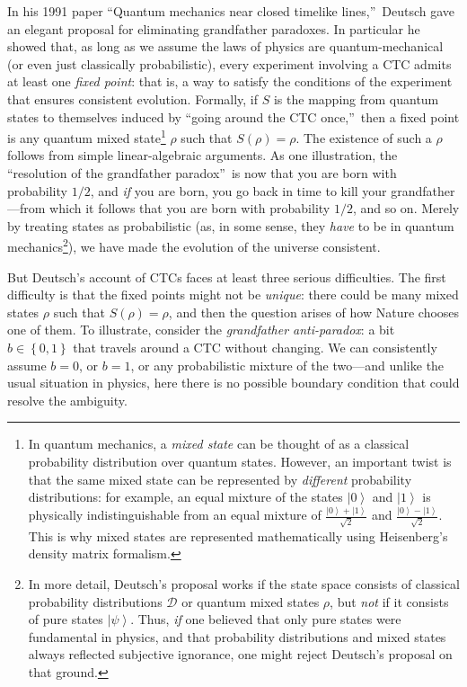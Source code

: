 \documentclass[12pt,onecolumn]{article}%
\begin{document}
In his 1991 paper \textquotedblleft Quantum mechanics near closed timelike
lines,\textquotedblright\  Deutsch \cite{deutsch:ctc} gave an elegant proposal
for eliminating grandfather paradoxes. In particular he showed that, as long
as we assume the laws of physics are quantum-mechanical (or even just
classically probabilistic), every experiment involving a CTC admits at least
one \textit{fixed point}: that is, a way to satisfy the conditions of the
experiment that ensures consistent evolution. Formally, if $S$ is the
mapping from quantum states to themselves induced by \textquotedblleft going
around the CTC once,\textquotedblright\  then a fixed point is any quantum
mixed state\footnote{In quantum mechanics, a \textit{mixed state} can be
thought of as a classical probability distribution over quantum states.
 However, an important twist is that the same mixed state can be represented
by \textit{different} probability distributions: for example, an equal mixture
of the states $\left\vert 0\right\rangle $ and $\left\vert 1\right\rangle
$ is physically indistinguishable from an equal mixture of $\frac{\left\vert
0\right\rangle +\left\vert 1\right\rangle }{\sqrt{2}}$ and $\frac{\left\vert
0\right\rangle -\left\vert 1\right\rangle }{\sqrt{2}}$. This is why mixed
states are represented mathematically using Heisenberg's density matrix
formalism.} $\rho$ such that $S\left(  \rho\right)  =\rho$. The existence
of such a $\rho$ follows from simple linear-algebraic arguments. As one
illustration, the \textquotedblleft resolution of the grandfather
paradox\textquotedblright\  is now that you are born with probability $1/2$,
and \textit{if} you are born, you go back in time to kill your
grandfather---from which it follows that you are born with probability $1/2$,
and so on. Merely by treating states as probabilistic (as, in some sense,
they \textit{have} to be in quantum mechanics\footnote{In more detail,
Deutsch's proposal works if the state space consists of classical probability
distributions $\mathcal{D}$ or quantum mixed states $\rho$, but \textit{not}
if it consists of pure states $\left\vert \psi\right\rangle $. Thus,
\textit{if} one believed that only pure states were fundamental in physics,
and that probability distributions and mixed states always reflected
subjective ignorance, one might reject Deutsch's proposal on that ground.}),
we have made the evolution of the universe consistent.

But Deutsch's account of CTCs faces at least three serious difficulties. The
first difficulty is that the fixed points might not be \textit{unique}: there
could be many mixed states $\rho$ such that $S\left(  \rho\right)  =\rho$,
and then the question arises of how Nature chooses one of them. To
illustrate, consider the \textit{grandfather anti-paradox}: a bit
$b\in\left\{  0,1\right\}  $ that travels around a CTC without changing. We
can consistently assume $b=0$, or $b=1$, or any probabilistic mixture of the
two---and unlike the usual situation in physics, here there is no possible
boundary condition that could resolve the ambiguity.
\end{document}
